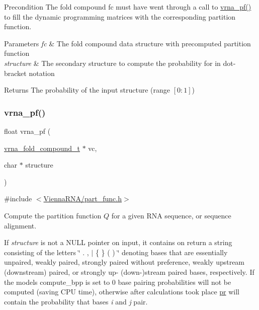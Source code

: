 \begin{DoxyPrecond}{Precondition}
The fold compound {\ttfamily fc} must have went through a call to \hyperlink{group__part__func__global_ga29e256d688ad221b78d37f427e0e99bc}{vrna\+\_\+pf()} to fill the dynamic programming matrices with the corresponding partition function.
\end{DoxyPrecond}

\begin{DoxyParams}{Parameters}
{\em fc} & The fold compound data structure with precomputed partition function \\
\hline
{\em structure} & The secondary structure to compute the probability for in dot-\/bracket notation \\
\hline
\end{DoxyParams}
\begin{DoxyReturn}{Returns}
The probability of the input structure (range $[0:1]$) 
\end{DoxyReturn}
\mbox{\label{group__part__func__global_ga29e256d688ad221b78d37f427e0e99bc}} 
\subsubsection{\texorpdfstring{vrna\+\_\+pf()}{vrna\_pf()}}
{\footnotesize\ttfamily float vrna\+\_\+pf (\begin{DoxyParamCaption}\item[{\hyperlink{group__fold__compound_ga1b0cef17fd40466cef5968eaeeff6166}{vrna\+\_\+fold\+\_\+compound\+\_\+t} $\ast$}]{vc,  }\item[{char $\ast$}]{structure }\end{DoxyParamCaption})}



{\ttfamily \#include $<$\hyperlink{part__func_8h}{Vienna\+R\+N\+A/part\+\_\+func.\+h}$>$}



Compute the partition function $Q$ for a given R\+NA sequence, or sequence alignment. 

If {\itshape structure} is not a N\+U\+LL pointer on input, it contains on return a string consisting of the letters \char`\"{} . , $\vert$ \{ \} ( ) \char`\"{} denoting bases that are essentially unpaired, weakly paired, strongly paired without preference, weakly upstream (downstream) paired, or strongly up-\/ (down-\/)stream paired bases, respectively. If the model\textquotesingle{}s compute\+\_\+bpp is set to 0 base pairing probabilities will not be computed (saving C\+PU time), otherwise after calculations took place \hyperlink{fold__vars_8h_ac98ec419070aee6831b44e5c700f090f}{pr} will contain the probability that bases {\itshape i} and {\itshape j} pair.

